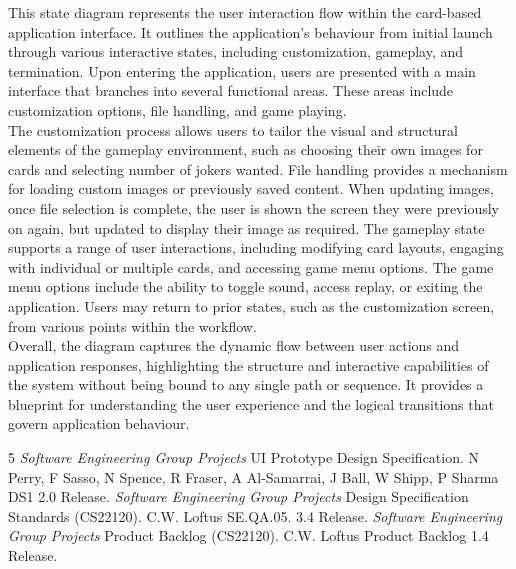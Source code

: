 \documentclass[a4paper]{project}
\begin{document}
			This state diagram represents the user interaction flow within the card-based application interface. It outlines the application's behaviour from initial launch through various interactive states, including customization, gameplay, and termination. Upon entering the application, users are presented with a main interface that branches into several functional areas. These areas include customization options, file handling, and game playing. \\
			The customization process allows users to tailor the visual and structural elements of the gameplay environment, such as choosing their own images for cards and selecting number of jokers wanted. File handling provides a mechanism for loading custom images or previously saved content. When updating images, once file selection is complete, the user is shown the screen they were previously on again, but updated to display their image as required. The gameplay state supports a range of user interactions, including modifying card layouts, engaging with individual or multiple cards, and accessing game menu options. The game menu options include the ability to toggle sound, access replay, or exiting the application. Users may return to prior states, such as the customization screen, from various points within the workflow. \\
			Overall, the diagram captures the dynamic flow between user actions and application responses, highlighting the structure and interactive capabilities of the system without being bound to any single path or sequence. It provides a blueprint for understanding the user experience and the logical transitions that govern application behaviour.
			
			\clearpage
		
		
		\begin{thebibliography}{5}
			 \emph{Software Engineering Group Projects}
			UI Prototype Design Specification.
			N Perry, F Sasso, N Spence, R Fraser, A Al-Samarrai, J Ball, W Shipp, P Sharma DS1 2.0 Release.
			 \emph{Software Engineering Group Projects}
			Design Specification Standards (CS22120).
			C.W. Loftus SE.QA.05. 3.4 Release.
			 \emph{Software Engineering Group Projects}
			Product Backlog (CS22120).
			C.W. Loftus Product Backlog 1.4 Release.
		\end{thebibliography}
		
		\clearpage
		
\end{document}
